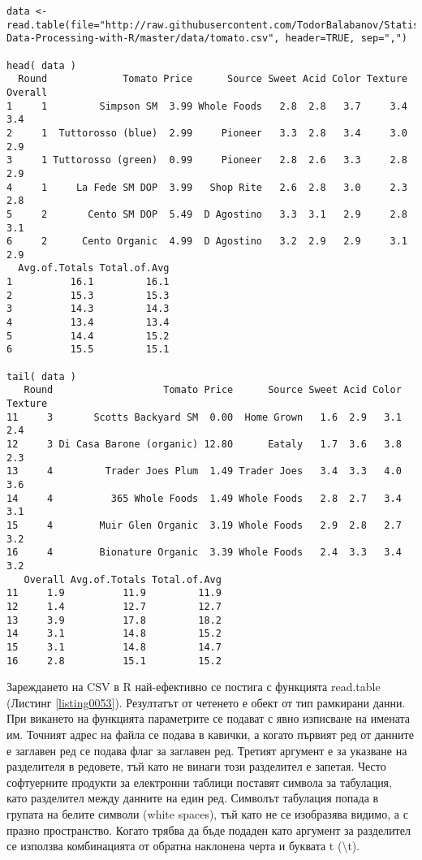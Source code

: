 \begin{lstlisting}[caption=Зареждане на данни от CSV файл, label=listing0053]
data <- read.table(file="http://raw.githubusercontent.com/TodorBalabanov/Statistical-Data-Processing-with-R/master/data/tomato.csv", header=TRUE, sep=",")

head( data )
  Round             Tomato Price      Source Sweet Acid Color Texture Overall
1     1         Simpson SM  3.99 Whole Foods   2.8  2.8   3.7     3.4     3.4
2     1  Tuttorosso (blue)  2.99     Pioneer   3.3  2.8   3.4     3.0     2.9
3     1 Tuttorosso (green)  0.99     Pioneer   2.8  2.6   3.3     2.8     2.9
4     1     La Fede SM DOP  3.99   Shop Rite   2.6  2.8   3.0     2.3     2.8
5     2       Cento SM DOP  5.49  D Agostino   3.3  3.1   2.9     2.8     3.1
6     2      Cento Organic  4.99  D Agostino   3.2  2.9   2.9     3.1     2.9
  Avg.of.Totals Total.of.Avg
1          16.1         16.1
2          15.3         15.3
3          14.3         14.3
4          13.4         13.4
5          14.4         15.2
6          15.5         15.1

tail( data )
   Round                   Tomato Price      Source Sweet Acid Color Texture
11     3       Scotts Backyard SM  0.00  Home Grown   1.6  2.9   3.1     2.4
12     3 Di Casa Barone (organic) 12.80      Eataly   1.7  3.6   3.8     2.3
13     4         Trader Joes Plum  1.49 Trader Joes   3.4  3.3   4.0     3.6
14     4          365 Whole Foods  1.49 Whole Foods   2.8  2.7   3.4     3.1
15     4        Muir Glen Organic  3.19 Whole Foods   2.9  2.8   2.7     3.2
16     4        Bionature Organic  3.39 Whole Foods   2.4  3.3   3.4     3.2
   Overall Avg.of.Totals Total.of.Avg
11     1.9          11.9         11.9
12     1.4          12.7         12.7
13     3.9          17.8         18.2
14     3.1          14.8         15.2
15     3.1          14.8         14.7
16     2.8          15.1         15.2
\end{lstlisting}

Зареждането на CSV в R най-ефективно се постига с функцията read.table (Листинг \ref{listing0053}). Резултатът от четенето е обект от тип рамкирани данни. При викането на функцията параметрите се подават с явно изписване на имената им. Точният адрес на файла се подава в кавички, а когато първият ред от данните е заглавен ред се подава флаг за заглавен ред. Третият аргумент е за указване на разделителя в редовете, тъй като не винаги този разделител е запетая. Често софтуерните продукти за електронни таблици поставят символа за табулация, като разделител между данните на един ред. Символът табулация попада в групата на белите символи (white spaces), тъй като не се изобразява видимо, а с празно пространство. Когато трябва да бъде подаден като аргумент за разделител се използва комбинацията от обратна наклонена черта и буквата t (\textbackslash t).

